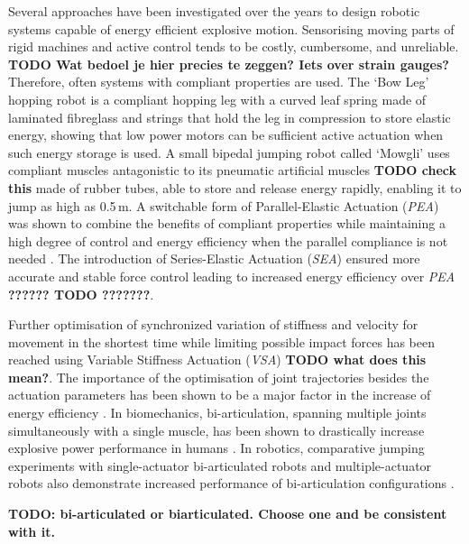 \documentclass[letterpaper, 10 pt, conference]{ieeeconf}  %
\begin{document}
Several approaches have been investigated over the years to design robotic systems capable of energy efficient explosive motion. Sensorising moving parts of rigid machines and active control tends to be costly, cumbersome, and unreliable. \textbf{TODO Wat bedoel je hier precies te zeggen? Iets over strain gauges?} Therefore, often systems with compliant properties are used. The `Bow Leg' hopping robot \cite{zeglin1999bow} is a compliant hopping leg with a curved leaf spring made of laminated fibreglass and strings that hold the leg in compression to store elastic energy, showing that low power motors can be sufficient active actuation when such energy storage is used. A small bipedal jumping robot called `Mowgli' \cite{niiyama2007mowgli} uses compliant muscles antagonistic to its pneumatic artificial muscles \textbf{TODO check this} made of rubber tubes, able to store and release energy rapidly, enabling it to jump as high as 0.5\,m. A switchable form of Parallel-Elastic Actuation (\textit{PEA}) was shown to combine the benefits of compliant properties while maintaining a high degree of control and energy efficiency when the parallel compliance is not needed \cite{liu2015spear}. The introduction of Series-Elastic Actuation (\textit{SEA}) ensured more accurate and stable force control leading to increased energy efficiency over \textit{PEA} \cite{pratt1995series,yesilevskiy2015comparison} \textbf{?????? TODO ???????}.

Further optimisation of synchronized variation of stiffness and velocity for movement in the shortest time while limiting possible impact forces has been reached using Variable Stiffness Actuation (\textit{VSA}) \cite{garabini2011optimality} \textbf{TODO what does this mean?}. The importance of the optimisation of joint trajectories besides the actuation parameters has been shown to be a major factor in the increase of energy efficiency \cite{velasco2013soft}. In biomechanics, bi-articulation, spanning multiple joints simultaneously with a single muscle, has been shown to drastically increase explosive power performance in humans \cite{schenau1989rotation,prilutsky1994tendon}. In robotics, comparative jumping experiments with single-actuator bi-articulated robots and multiple-actuator robots also demonstrate increased performance of bi-articulation configurations \cite{oshima2007jumping,babivc2009biarticulated,hyon2002development}.

\textbf{TODO: bi-articulated or biarticulated. Choose one and be consistent with it.}
\end{document}
